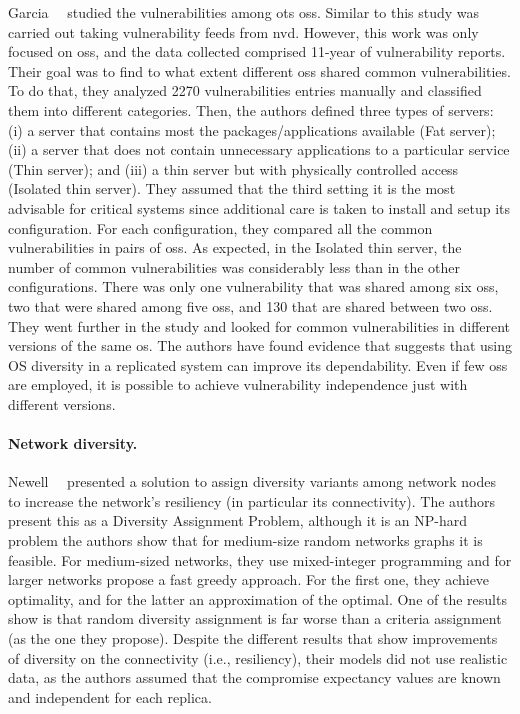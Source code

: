 Garcia~\etal{}~\cite{Garcia:2012} studied the vulnerabilities among \gls{ots} \glspl{os}. 
Similar to \cite{Han:2009} this study was carried out taking vulnerability feeds from \gls{nvd}. 
However, this work was only focused on \glspl{os}, and the data collected comprised 11-year of vulnerability reports. 
Their goal was to find to what extent different \glspl{os} shared common vulnerabilities. 
To do that, they analyzed 2270 vulnerabilities entries manually and classified them into different categories. 
Then, the authors defined three types of servers: (i) a server that contains most the packages/applications available (Fat server); (ii) a server that does not contain unnecessary applications to a particular
service (Thin server); and (iii) a thin server but with physically controlled access (Isolated thin server). 
They assumed that the third setting it is the most advisable for critical systems since additional care is taken to install and setup its configuration. 
For each configuration, they compared all the common vulnerabilities in pairs of \glspl{os}. 
As expected, in the Isolated thin server, the number of common vulnerabilities was considerably less than in the other configurations. 
There was only one vulnerability that was shared among six \glspl{os}, two that were shared among five \glspl{os}, and 130 that are shared between two \glspl{os}. 
They went further in the study and looked for common vulnerabilities in different versions of the same \gls{os}. 
The authors have found evidence that suggests that using OS diversity in a replicated system can improve its dependability. 
Even if few \glspl{os} are employed, it is possible to achieve vulnerability independence just with different versions.


\paragraph{Network diversity.}
Newell~\etal{}~\cite{Newell:2015} presented a solution to assign diversity variants among network nodes to increase the network's resiliency (in particular its connectivity).
The authors present this as a Diversity Assignment Problem, although it is an NP-hard problem the authors show that for medium-size random networks graphs it is feasible.
For medium-sized networks, they use mixed-integer programming and for larger networks propose a fast greedy approach.
For the first one, they achieve optimality, and for the latter an approximation of the optimal.
One of the results show is that random diversity assignment is far worse than a criteria assignment (as the one they propose).
Despite the different results that show improvements of diversity on the connectivity (i.e., resiliency), their models did not use realistic data, as the authors assumed that the compromise expectancy values are known and independent for each replica.


